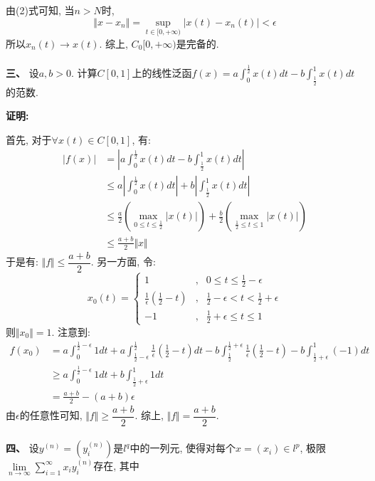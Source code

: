 \documentclass{article}
\begin{document}
由(2)式可知, 当$n > N$时,
$$\Vert x - x_n \Vert  =  \sup\limits_{t \in [0, +\infty)} |x(t) - x_n(t)| < \epsilon$$
所以$x_n(t) \rightarrow x(t)$. 综上, $C_0[0,+\infty)$是完备的. \\ \\

\textbf{三、}  设$a, b > 0$. 计算$C[0,1]$上的线性泛函$f(x) = a\int_0^{\frac{1}{2}}x(t)dt - b\int_{\frac{1}{2}}^1 x(t) dt$的范数. 

\textbf{证明:}

首先, 对于$\forall x(t) \in C[0,1]$, 有:
\begin{align*}
|f(x)| &= |a\int_0^{\frac{1}{2}}x(t)dt - b\int_{\frac{1}{2}}^1 x(t) dt| \\
       &\leq a|\int_0^{\frac{1}{2}}x(t)dt| + b|\int_{\frac{1}{2}}^1 x(t) dt| \\
       &\leq \frac{a}{2} (\max\limits_{0 \leq t \leq \frac{1}{2}} |x(t)|) + \frac{b}{2} (\max\limits_{\frac{1}{2} \leq t \leq 1} |x(t)|)  \\
       &\leq \frac{a+b}{2} \Vert x \Vert 
\end{align*}
于是有: $\Vert f \Vert \leq \dfrac{a+b}{2}$. 另一方面, 令:
$$x_0(t) = \left\{
\begin{array}{lcl}
1  &, & 0 \leq t \leq \frac{1}{2} - \epsilon \\
\frac{1}{\epsilon}(\frac{1}{2} - t) &, & \frac{1}{2} - \epsilon < t < \frac{1}{2}+\epsilon \\
-1 &, & \frac{1}{2}+\epsilon \leq t \leq 1
\end{array}
\right.
$$
则$ \Vert x_0 \Vert = 1 $. 注意到:
\begin{align*}
f(x_0) &=  a\int_0^{\frac{1}{2}-\epsilon} 1 dt + a\int_{\frac{1}{2}-\epsilon}^{\frac{1}{2}}\frac{1}{\epsilon}(\frac{1}{2} - t)   dt  - b\int_{\frac{1}{2}}^{\frac{1}{2}+\epsilon} \frac{1}{\epsilon}(\frac{1}{2} - t) - b\int_{\frac{1}{2}+\epsilon}^1 (-1) dt \\
       &\geq a\int_0^{\frac{1}{2}-\epsilon} 1 dt + b\int_{\frac{1}{2}+\epsilon}^1  1 dt \\
       &= \frac{a+b}{2} - (a+b)\epsilon
\end{align*}
由$\epsilon$的任意性可知, $\Vert f \Vert \geq \dfrac{a+b}{2}$. 综上, $\Vert f \Vert = \dfrac{a+b}{2}$. \\  \\ 

\textbf{四、} 设$y^{(n)} = (y_i^{(n)})$是$l^q$中的一列元, 使得对每个$x=(x_i) \in l^p$, 极限$\lim\limits_{n \rightarrow \infty} \sum\limits_{i=1}^{\infty} x_iy_i^{(n)}$存在, 其中
\end{document}
